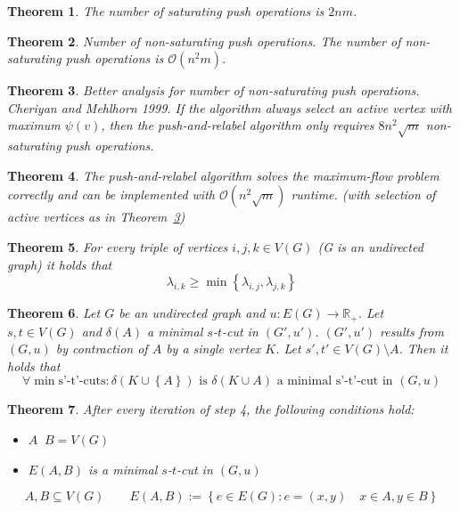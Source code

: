 \documentclass{article}
\newtheorem{theorem}{Theorem}
\newcommand{\set}[1]{\left\{#1\right\}}
\begin{document}
\begin{theorem}\label{lemma-4.12}
  The number of saturating push operations is $2nm$.
\end{theorem}
\begin{theorem}\label{lemma-4.13}
  \emph{Number of non-saturating push operations.}
  The number of non-saturating push operations is $\mathcal{O}(n^2m)$.
\end{theorem}
\begin{theorem}\label{lemma-4.14}
  \emph{Better analysis for number of non-saturating push operations. Cheriyan and Mehlhorn 1999.}
  If the algorithm always select an active vertex with maximum $\psi(v)$, then the push-and-relabel algorithm only requires $8n^2 \sqrt{m}$ non-saturating push operations.
\end{theorem}
\begin{theorem}\label{satz-4.15}
  The push-and-relabel algorithm solves the maximum-flow problem correctly and can be implemented with $\mathcal{O}(n^2 \sqrt{m})$ runtime.
  (with selection of active vertices as in Theorem~\ref{lemma-4.14})
\end{theorem}
\begin{theorem}\label{lemma-4.5}
  For every triple of vertices $i, j, k \in V(G)$ (G is an undirected graph) it holds that
  \[
    \lambda_{i,k} \geq \min{\set{\lambda_{i,j}, \lambda_{j,k}}}
  \]
\end{theorem}
\begin{theorem}\label{lemma-4.16}
  Let $G$ be an undirected graph and $u: E(G) \rightarrow \mathbb{R}_+$.
  Let $s, t \in V(G)$ and $\delta(A)$ a minimal $s$-$t$-cut in $(G', u')$.
  $(G', u')$ results from $(G, u)$ by contraction of $A$ by a single vertex $K$.
  Let $s', t' \in V(G) \setminus A$. Then it holds that
  \[
    \forall \min{\text{s'-t'-cuts}}: \delta(K \cup \set{A}) \text{ is }
      \delta(K \cup A) \text{ a minimal s'-t'-cut in } (G, u)
  \]
\end{theorem}
\begin{theorem}\label{lemma-4.17}
  After every iteration of step 4, the following conditions hold:
  \begin{itemize}
    \item $A \mathop{\dot{\cup}} B = V(G)$
    \item $E(A, B)$ is a minimal $s$-$t$-cut in $(G, u)$
  \end{itemize}
  \[
    A, B \subseteq V(G)  \qquad  E(A, B) := \set{e \in E(G): e = (x, y) \quad x \in A, y \in B}
  \]
\end{theorem}
\end{document}
